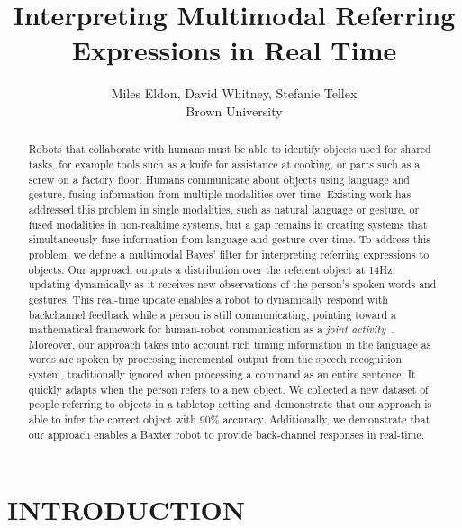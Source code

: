 \documentclass[letterpaper, 10 pt, conference]{ieeeconf}
\title{\LARGE \bf
Interpreting Multimodal Referring Expressions in Real Time}
\author{Miles Eldon, David Whitney, Stefanie Tellex\\Brown University}
\begin{document}
\maketitle
\thispagestyle{empty}
\pagestyle{empty}

\begin{abstract}
Robots that collaborate with humans must be able to identify objects
used for shared tasks, for example tools such as a knife for
assistance at cooking, or parts such as a screw on a factory floor.
Humans communicate about objects using language and gesture, fusing
information from multiple modalities over time.  Existing work has
addressed this problem in single modalities, such as natural language
or gesture, or fused modalities in non-realtime systems, but a gap
remains in creating systems that simultaneously fuse information from
language and gesture over time.  To address this problem, we define a
multimodal Bayes' filter for interpreting referring expressions to
objects.  Our approach outputs a distribution over the referent object
at 14Hz, updating dynamically as it receives new observations of the
person's spoken words and gestures.  This real-time update enables a
robot to dynamically respond with backchannel feedback while a person
is still communicating, pointing toward a mathematical framework for
human-robot communication as a {\em joint activity}~\citep{clark96}.
Moreover, our approach takes into account rich timing information in
the language as words are spoken by processing incremental output from
the speech recognition system, traditionally ignored when processing a
command as an entire sentence.  It quickly adapts when the person
refers to a new object.  We collected a new dataset of people
referring to objects in a tabletop setting and demonstrate that our
approach is able to infer the correct object with 90\% accuracy.  Additionally, we
demonstrate that our approach enables a Baxter robot to provide
back-channel responses in real-time.
\end{abstract}

\section{INTRODUCTION}
\end{document}
